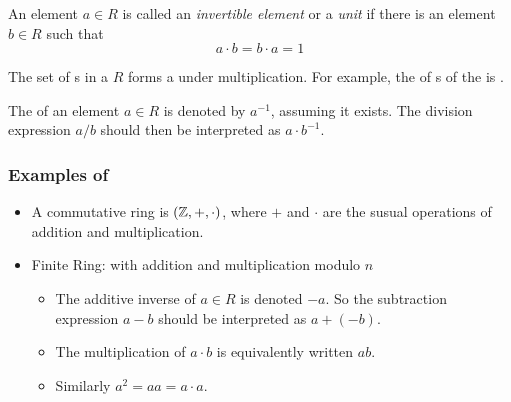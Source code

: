 \begin{definition}\label{def:Invertible_Element}
  An element $a \in R$ is called an \emph{invertible element} or a \emph{unit} if there is an element $b \in R$ such that
  \begin{equation}\label{eq:Invertible_Element}
    a \cdot b = b \cdot a = 1
  \end{equation}

  \begin{remark}
    The set of s in a  $R$ forms a  under multiplication.
    For example, the  of s of the  \TextIntsModN{} is \TextMultiplicativeGroupN{}.
  \end{remark}
  
  \begin{remark}\label{rmk:Ring_Multiplicative_Inverse}
    The  of an element $a \in R$ is denoted by $a^{-1}$, assuming it exists.
    The division expression $a/b$ should then be interpreted as $a \cdot b^{-1}$.
  \end{remark}
\end{definition}

\subsubsection{Examples of }\label{subsubsec:Examples_of_Rings}
\begin{itemize}[noitemsep]
\item A commutative ring is $(\operatorname{\mathbb{Z}}, +, \cdot)$, where $+$ and $\cdot$ are the susual operations of addition and multiplication.
\item Finite Ring: \TextIntsModN{} with addition and multiplication modulo $n$
  \begin{itemize}[noitemsep]
  \item The additive inverse of $a \in R$ is denoted $-a$. So the subtraction expression $a-b$ should be interpreted as $a + (-b)$.
  \item The multiplication of $a \cdot b$ is equivalently written $ab$.
  \item Similarly $a^{2} = aa = a \cdot a$.
  \end{itemize}
\end{itemize}

